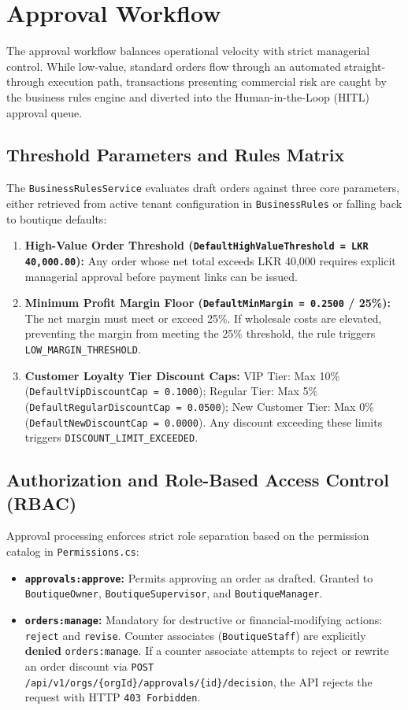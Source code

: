\section{Approval Workflow}
\label{sec:c-approval}

The approval workflow balances operational velocity with strict managerial control. While low-value, standard orders flow through an automated straight-through execution path, transactions presenting commercial risk are caught by the business rules engine and diverted into the Human-in-the-Loop (HITL) approval queue.

\subsection{Threshold Parameters and Rules Matrix}

The \texttt{BusinessRulesService} evaluates draft orders against three core parameters, either retrieved from active tenant configuration in \texttt{BusinessRules} or falling back to boutique defaults:
\begin{enumerate}
    \item \textbf{High-Value Order Threshold (\texttt{DefaultHighValueThreshold = LKR 40,000.00}):} Any order whose net total exceeds LKR 40,000 requires explicit managerial approval before payment links can be issued.
    \item \textbf{Minimum Profit Margin Floor (\texttt{DefaultMinMargin = 0.2500} / 25\%):} The net margin must meet or exceed 25\%. If wholesale costs are elevated, preventing the margin from meeting the 25\% threshold, the rule triggers \texttt{LOW\_MARGIN\_THRESHOLD}.
    \item \textbf{Customer Loyalty Tier Discount Caps:} VIP Tier: Max 10\% (\texttt{DefaultVipDiscountCap = 0.1000}); Regular Tier: Max 5\% (\texttt{DefaultRegularDiscountCap = 0.0500}); New Customer Tier: Max 0\% (\texttt{DefaultNewDiscountCap = 0.0000}). Any discount exceeding these limits triggers \texttt{DISCOUNT\_LIMIT\_EXCEEDED}.
\end{enumerate}

\subsection{Authorization and Role-Based Access Control (RBAC)}

Approval processing enforces strict role separation based on the permission catalog in \texttt{Permissions.cs}:
\begin{itemize}
    \item \textbf{\texttt{approvals:approve}:} Permits approving an order as drafted. Granted to \texttt{BoutiqueOwner}, \texttt{BoutiqueSupervisor}, and \texttt{BoutiqueManager}.
    \item \textbf{\texttt{orders:manage}:} Mandatory for destructive or financial-modifying actions: \texttt{reject} and \texttt{revise}. Counter associates (\texttt{BoutiqueStaff}) are explicitly \textbf{denied} \texttt{orders:manage}. If a counter associate attempts to reject or rewrite an order discount via \texttt{POST /api/v1/orgs/\{orgId\}/approvals/\{id\}/decision}, the API rejects the request with HTTP \texttt{403 Forbidden}.
\end{itemize}

